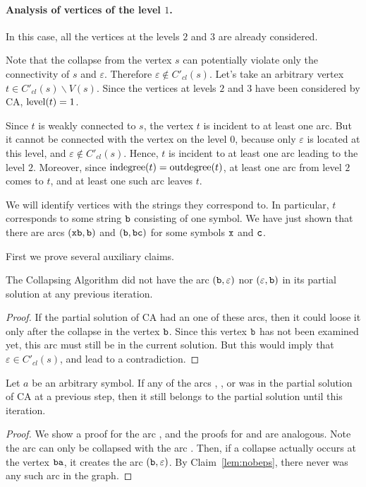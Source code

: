\paragraph{Analysis of vertices of the level \texorpdfstring{$1$}{1}.}

In this case, all the vertices at the levels $ 2 $ and $ 3 $ are already considered.

Note that the collapse from the vertex $ s $ can potentially violate only the connectivity of $ s $ and $ \varepsilon $. Therefore $ \varepsilon \notin C'_{cl} (s) $. Let's take an arbitrary vertex $ t \in C'_{cl}(s) \backslash V(s)$. Since the vertices at levels $2$ and $3$ have been considered by CA, $ \operatorname{level} (t) = 1 $.

Since $t$ is weakly connected to $s$, the vertex $ t $ is incident to at least one arc. But it cannot be connected with the vertex on the level $ 0 $, because only $ \varepsilon $ is located at this level, and $ \varepsilon \notin C'_{cl} (s) $. Hence, $ t $ is incident to at least one arc leading to the level $ 2 $. Moreover, since $ \operatorname{indegree}(t)=\operatorname{outdegree}(t)$, at least one arc from level $2$ comes to $ t $, and at least one such arc leaves $ t $.

We will identify vertices with the strings they correspond to. In particular, $ t $ corresponds to some string $ \tt b $ consisting of one symbol. We have just shown that there are arcs $ ({\tt xb}, {\tt b}) $ and $ ({\tt b}, {\tt bc}) $ for some symbols $ {\tt x} $ and $ {\tt c} $.

First we prove several auxiliary claims.

\begin{claim}
\label{lem:nobeps}
The Collapsing Algorithm did not have the arc $ ({\tt b}, \varepsilon) $ nor $ (\varepsilon, {\tt b}) $ in its partial solution at any previous iteration.
\end{claim}
\begin{proof}
If the partial solution of CA had an one of these arcs, then it could loose it only after the collapse in the vertex $ {\tt b} $. Since this vertex $ {\tt b} $ has not been examined yet, this arc must still be in the current solution. But this would imply that $ \varepsilon \in C'_{cl} (s) $, and lead to a contradiction.
\end{proof}

\begin{claim}
\label{lem:bccsave}
Let $a$ be an arbitrary symbol. If any of the arcs , , or  was in the partial solution of CA at a previous step, then it still belongs to the partial solution until this iteration.
\end{claim}
\begin{proof}
We show a proof for the arc , and the proofs for  and  are analogous.  Note the arc  can only be collapsed with the arc . Then, if a collapse actually occurs at the vertex $ {\tt ba} $, it creates the arc $ ({\tt b}, \varepsilon) $. By Claim~\ref{lem:nobeps}, there never was any such arc in the graph. \end{proof}

